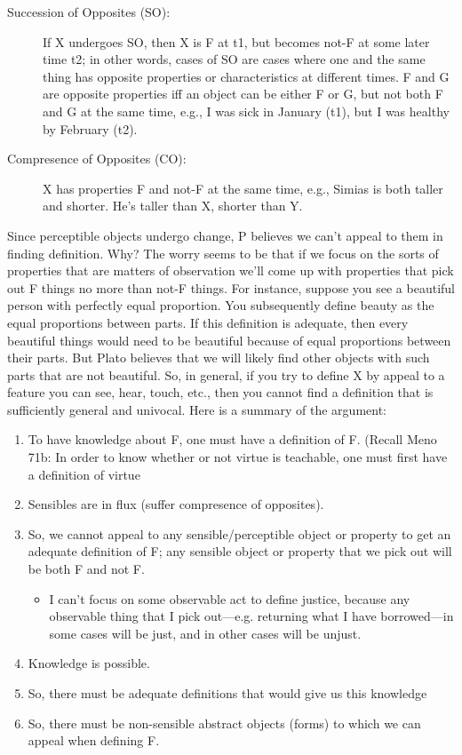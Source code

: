 \documentclass[oneside]{article}
\begin{document}
\begin{description}
\item[Succession of Opposites (SO):] If X undergoes SO, then X is F at t1, but
becomes not-F at some later time t2; in other words, cases of SO are
cases where one and the same thing has opposite properties or
characteristics at different times. F and G are opposite properties iff an object can be either F or G, but not both F and G at the same time, e.g., I was sick in January (t1), but I was healthy by February (t2).

\item[Compresence of Opposites (CO):] X has  properties F and not-F at the same time, e.g., Simias is both taller and shorter. He's taller than X, shorter than Y.

\end{description}
Since perceptible objects undergo change, P believes we can't appeal to them in finding definition. Why?  The worry seems to be that if we focus on the sorts of properties that are matters of observation we'll come up with properties that pick out F things no more than not-F things. For instance, suppose you see a beautiful person with perfectly equal proportion. You subsequently define beauty as the equal proportions between parts. If this definition is adequate, then every beautiful things would need to be beautiful because of equal proportions between their parts. But Plato believes that we will likely find other objects with such parts that are not beautiful. So, in general, if you try to define X by appeal to a feature you can see, hear, touch, etc., then you cannot find a definition that is sufficiently general and univocal. Here is a summary of the argument: 
\begin{enumerate}
\item  To have knowledge about F, one must have a definition of F. (Recall  Meno 71b: In order to know whether or not virtue is teachable,  one must first have a definition of virtue
\item  Sensibles are in flux  (suffer compresence of opposites).
\item  So, we cannot appeal to any sensible/perceptible object or property to get an adequate definition
  of F; any sensible object or property that we pick out will be both F  and not F.
\begin{itemize}
\item I can't focus on some observable act to define justice, because any observable
thing that I pick out---e.g. returning what I have borrowed---in some
cases will be just, and in other cases will be unjust.
\end{itemize}
\item Knowledge is possible.
\item  So, there must be adequate definitions that would give us this knowledge
\item So, there must be non-sensible abstract objects (forms) to which we can appeal when
  defining F.
\end{enumerate}
\end{document}
